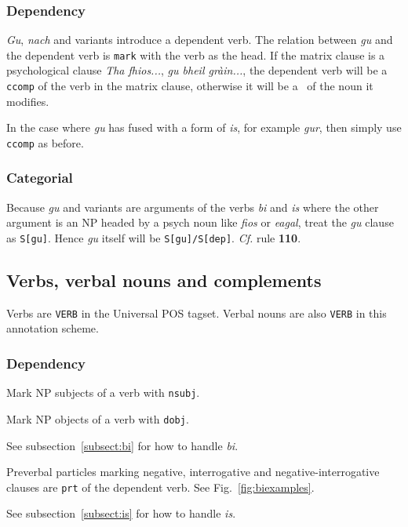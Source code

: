 \documentclass[a4paper]{article}
\begin{document}
\subsubsection*{Dependency}
 \textit{Gu}, \textit{nach} and variants introduce a dependent verb.
The relation between \textit{gu} and the dependent verb is \texttt{mark} with the verb as the head.
If the matrix clause is a psychological clause \textit{Tha fhios...}, \textit{gu bheil gr\`ain...}, the dependent verb will be a \texttt{ccomp} of the verb in the matrix clause, otherwise it will be a \ccomp\ of the noun it modifies.


 In the case where \textit{gu} has fused with a form of \textit{is}, for example \textit{gur}, then simply use \texttt{ccomp} as before.
\subsubsection*{Categorial}
 Because \textit{gu} and variants are arguments of the verbs \textit{bi} and \textit{is} where the other argument is an NP headed by a psych noun like \textit{fios} or \textit{eagal}, treat the \textit{gu} clause as \texttt{S[gu]}.
Hence \textit{gu} itself will be \texttt{S[gu]/S[dep]}.
\textit{Cf.} rule \textbf{110}. 


\subsection{Verbs, verbal nouns and complements\label{subsect:verbs}}

Verbs are \texttt{VERB} in the Universal POS tagset.
Verbal nouns are also \texttt{VERB} in this annotation scheme.

\subsubsection*{Dependency}

 Mark NP subjects of a verb with \texttt{nsubj}.

 Mark NP objects of a verb with \texttt{dobj}.

 See subsection~\ref{subsect:bi} for how to handle \textit{bi}.

 Preverbal particles marking negative, interrogative and negative-interrogative clauses are \texttt{prt} of the dependent verb. See Fig.~\ref{fig:biexamples}.

 See subsection~\ref{subsect:is} for how to handle \textit{is}.
\end{document}
